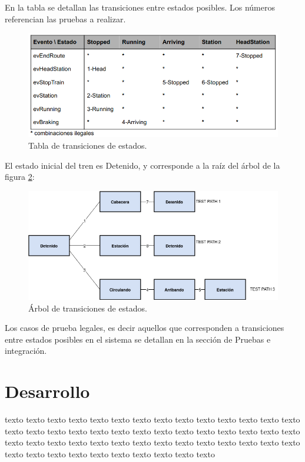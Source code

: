 \documentclass[
11pt, %
]{charter}
\begin{document}
En la tabla se detallan las transiciones entre estados posibles. Los números referencian las pruebas a realizar.

\begin{figure}[htpb]
\centering 
\includegraphics[width=1\textwidth]{./Pics/TablaStatechart.1.png}
\caption{Tabla de transiciones de estados.}
\label{fig:State transition table}
\end{figure}

El estado inicial del tren es Detenido, y corresponde a la raíz del árbol de la figura \ref{fig:State tree}:

\begin{figure}[htpb]
\centering 
\includegraphics[width=1\textwidth]{./Pics/STT.Tree.png}
\caption{Árbol de transiciones de estados.}
\label{fig:State tree}
\end{figure}

Los casos de prueba legales, es decir aquellos que corresponden a
transiciones entre estados posibles en el sistema se detallan en la sección de Pruebas e integración.




\pagebreak
\section{Desarrollo}

texto texto texto texto texto texto texto texto texto texto texto texto texto texto texto texto texto texto texto texto texto texto texto texto texto texto texto texto texto texto texto texto texto texto texto texto texto texto texto texto texto texto texto texto texto texto texto texto texto texto texto texto 
\end{document}
